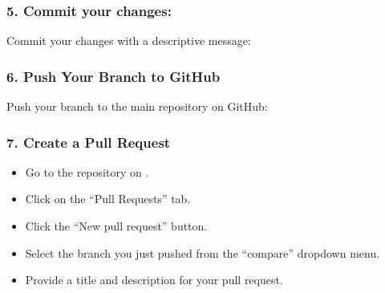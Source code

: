 \documentclass[letterpaper,10pt,english]{sphinxhowto}
\begin{document}
\begin{description}
\subsubsection{5. Commit your changes:}
\label{\detokenize{get-started:commit-your-changes}}
\sphinxAtStartPar
Commit your changes with a descriptive message:

\begin{sphinxVerbatim}[commandchars=\\\{\}]
   
\end{sphinxVerbatim}


\subsubsection{6. Push Your Branch to GitHub}
\label{\detokenize{get-started:push-your-branch-to-github}}
\sphinxAtStartPar
Push your branch to the main repository on GitHub:

\begin{sphinxVerbatim}[commandchars=\\\{\}]
   
\end{sphinxVerbatim}


\subsubsection{7. Create a Pull Request}
\label{\detokenize{get-started:create-a-pull-request}}\begin{itemize}
\item {} 
\sphinxAtStartPar
Go to the repository on .

\item {} 
\sphinxAtStartPar
Click on the “Pull Requests” tab.

\item {} 
\sphinxAtStartPar
Click the “New pull request” button.

\item {} 
\sphinxAtStartPar
Select the branch you just pushed from the “compare” drop\sphinxhyphen{}down menu.

\item {} 
\sphinxAtStartPar
Provide a title and description for your pull request.


\end{itemize}
\end{description}
\end{document}
